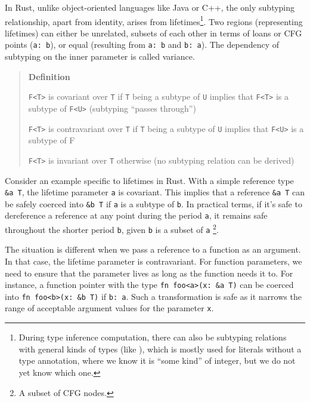 \documentclass[
  11pt,
  twoside,symmetric]{report}
\begin{document}
In Rust, unlike object-oriented languages like Java or C++, the only
subtyping relationship, apart from identity, arises from
lifetimes\footnote{During type inference computation, there can also be
  subtyping relations with general kinds of types (like ), which is
  mostly used for literals without a type annotation, where we know it
  is ``some kind'' of integer, but we do not yet know which one.}. Two
regions (representing lifetimes) can either be unrelated, subsets of
each other in terms of loans or CFG points
(\texttt{\textquotesingle{}a:\ \textquotesingle{}b}), or equal
(resulting from \texttt{\textquotesingle{}a:\ \textquotesingle{}b} and
\texttt{\textquotesingle{}b:\ \textquotesingle{}a}). The dependency of
subtyping on the inner parameter is called variance.

\begin{quote}
\textbf{Definition} 

\texttt{F\textless{}T\textgreater{}} is covariant over \texttt{T} if
\texttt{T} being a subtype of \texttt{U} implies that
\texttt{F\textless{}T\textgreater{}} is a subtype of
\texttt{F\textless{}U\textgreater{}} (subtyping ``passes through'')

\texttt{F\textless{}T\textgreater{}} is contravariant over \texttt{T} if
\texttt{T} being a subtype of \texttt{U} implies that
\texttt{F\textless{}U\textgreater{}} is a subtype of F

\texttt{F\textless{}T\textgreater{}} is invariant over \texttt{T}
otherwise (no subtyping relation can be derived)
\end{quote}

Consider an example specific to lifetimes in Rust. With a simple
reference type \texttt{\&\textquotesingle{}a\ T}, the lifetime parameter
\texttt{\textquotesingle{}a} is covariant. This implies that a reference
\texttt{\&\textquotesingle{}a\ T} can be safely coerced into
\texttt{\&\textquotesingle{}b\ T} if \texttt{\textquotesingle{}a} is a
subtype of \texttt{\textquotesingle{}b}. In practical terms, if it's
safe to dereference a reference at any point during the period
\texttt{\textquotesingle{}a}, it remains safe throughout the shorter
period \texttt{\textquotesingle{}b}, given \texttt{\textquotesingle{}b}
is a subset of \texttt{\textquotesingle{}a} \footnote{A subset of CFG
  nodes.}.

The situation is different when we pass a reference to a function as an
argument. In that case, the lifetime parameter is contravariant. For
function parameters, we need to ensure that the parameter lives as long
as the function needs it to. For instance, a function pointer with the
type
\texttt{fn\ foo\textless{}\textquotesingle{}a\textgreater{}(x:\ \&\textquotesingle{}a\ T)}
can be coerced into
\texttt{fn\ foo\textless{}\textquotesingle{}b\textgreater{}(x:\ \&\textquotesingle{}b\ T)}
if \texttt{\textquotesingle{}b:\ \textquotesingle{}a}. Such a
transformation is safe as it narrows the range of acceptable argument
values for the parameter \texttt{x}.
\end{document}
